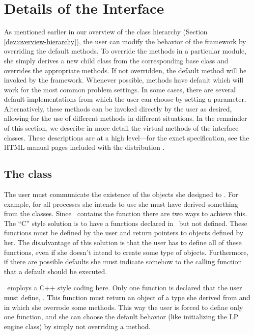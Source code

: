 \section{Details of the Interface}
\label{dev:user-derived}

As mentioned earlier in our overview of the class hierarchy (Section
\ref{dev:overview-hierarchy}), the user can modify the behavior of the
framework by overriding the default methods. To override the methods
in a particular module, she simply derives a new child class from the
corresponding  base class and overrides the
appropriate methods. If not overridden, the default method will be
invoked by the framework. Whenever possible, methods have default
which will work for the most common problem settings. In some cases,
there are several default implementations from which the user can
choose by setting a parameter. Alternatively, these methods can
be invoked directly by the user as desired, allowing for the use of
different methods in different situations. In the remainder of this
section, we describe in more detail the virtual methods of the
interface classes. These descriptions are at a high level---for the
exact specification, see the HTML manual pages included with the
distribution \cite{HTML-manual}.

\subsection{The  class}
\label{dev:USER_initialize}

The user must communicate the existence of the objects she designed to
\BB. For example, for all processes she intends to use she must have
derived something from the  classes. Since \BB\
contains the  function there are two ways to achieve this.
The ``C'' style solution is to have a functions declared in \BB\ but
not defined. These functions must be defined by the user and return
pointers to objects defined by her. The disadvantage of this solution
is that the user has to define all of these functions, even if she
doesn't intend to create some type of objects. Furthermore, if there
are possible defaults she must indicate somehow to the calling
function that a default should be executed.

\BB\ employs a C++ style coding here. Only one function is declared that the
user must define, \code{BCP\_user\_init()}. This function must
return an object of a type she derived from  and
in which she overrode some methods. This way the user is forced to
define only one function, and she can choose the default behavior
(like initializing the LP engine class) by simply not overriding a
method.

